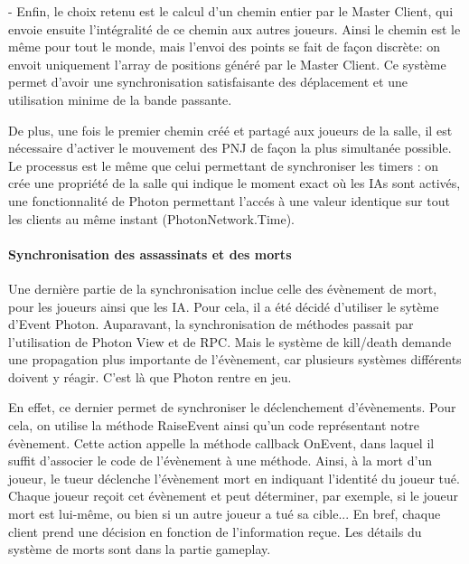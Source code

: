             - Enfin, le choix retenu est le calcul d'un chemin entier par le Master Client, qui envoie ensuite l'intégralité de ce chemin aux autres joueurs.
            Ainsi le chemin est le même pour tout le monde, mais l'envoi des points se fait de façon discrète: on envoit uniquement l'array de positions généré
            par le Master Client. Ce système permet d'avoir une synchronisation satisfaisante des déplacement et une utilisation minime de la bande passante.

            De plus, une fois le premier chemin créé et partagé aux joueurs de la salle, il est nécessaire d'activer le mouvement des PNJ de façon la plus simultanée possible.
            Le processus est le même que celui permettant de synchroniser les timers : on crée une propriété de la salle qui indique le moment exact où
            les IAs sont activés, une fonctionnalité de Photon permettant l'accés à une valeur identique sur tout les clients au même instant (PhotonNetwork.Time).

        \paragraph{Synchronisation des assassinats et des morts}

            Une dernière partie de la synchronisation inclue celle des évènement de mort, pour les joueurs ainsi
            que les IA. Pour cela, il a été décidé d'utiliser le sytème d'Event Photon. Auparavant, la synchronisation de méthodes
            passait par l'utilisation de Photon View et de RPC. Mais le système de kill/death demande une propagation plus importante
            de l'évènement, car plusieurs systèmes différents doivent y réagir. C'est là que Photon rentre en jeu.

            En effet, ce dernier permet de synchroniser le déclenchement d'évènements. Pour cela, on utilise la méthode RaiseEvent ainsi
            qu'un code représentant notre évènement. Cette action appelle la méthode callback OnEvent, dans laquel il suffit d'associer le
            code de l'évènement à une méthode. Ainsi, à la mort d'un joueur, le tueur déclenche l'évènement mort en indiquant l'identité du
            joueur tué. Chaque joueur reçoit cet évènement et peut déterminer, par exemple, si le joueur mort est lui-même, ou bien si un
            autre joueur a tué sa cible... En bref, chaque client prend une décision en fonction de l'information reçue.
            Les détails du système de morts sont dans la partie gameplay.

